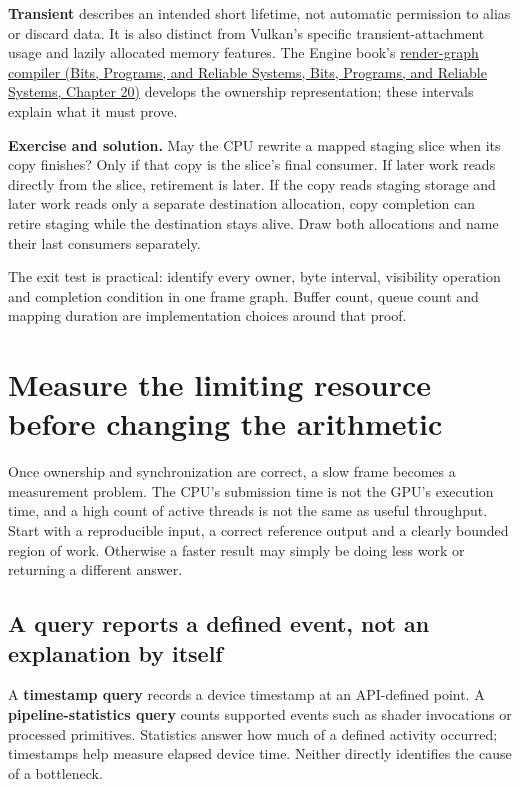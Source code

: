 \textbf{Transient} describes an intended short lifetime, not automatic permission to alias or discard data. It is also distinct from Vulkan's specific transient-attachment usage and lazily allocated memory features. The Engine book's \href{../01-Bits-Programs-and-Reliable-Systems/main.pdf\#nameddest=06-engine-ii-ch042-from-a-list-of-render-passes-to-a-proved-execution-order}{render-graph compiler (Bits, Programs, and Reliable Systems, Bits, Programs, and Reliable Systems, Chapter 20)} develops the ownership representation; these intervals explain what it must prove.

\textbf{Exercise and solution.} May the CPU rewrite a mapped staging slice when its copy finishes? Only if that copy is the slice's final consumer. If later work reads directly from the slice, retirement is later. If the copy reads staging storage and later work reads only a separate destination allocation, copy completion can retire staging while the destination stays alive. Draw both allocations and name their last consumers separately.

The exit test is practical: identify every owner, byte interval, visibility operation and completion condition in one frame graph. Buffer count, queue count and mapping duration are implementation choices around that proof.

\section{Measure the limiting resource before changing the arithmetic}\label{03-visual-computing-i-ch016-measure-the-limiting-resource-before-changing-the-arithmetic}

Once ownership and synchronization are correct, a slow frame becomes a measurement problem. The CPU's submission time is not the GPU's execution time, and a high count of active threads is not the same as useful throughput. Start with a reproducible input, a correct reference output and a clearly bounded region of work. Otherwise a faster result may simply be doing less work or returning a different answer.

\subsection{A query reports a defined event, not an explanation by itself}\label{03-visual-computing-i-ch016-a-query-reports-a-defined-event-not-an-explanation-by-itself}

A \textbf{timestamp query} records a device timestamp at an API-defined point. A \textbf{pipeline-statistics query} counts supported events such as shader invocations or processed primitives. Statistics answer how much of a defined activity occurred; timestamps help measure elapsed device time. Neither directly identifies the cause of a bottleneck.

